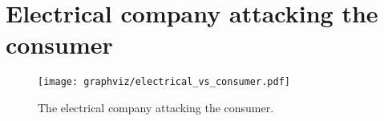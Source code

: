 \section{Electrical company attacking the consumer}


\begin{figure}
  \begin{center}
    \texttt{[image: graphviz/electrical\_vs\_consumer.pdf]}
  \end{center}
  \caption{The electrical company attacking the consumer.}
  \label{electrical_vs_consumer}
\end{figure}

